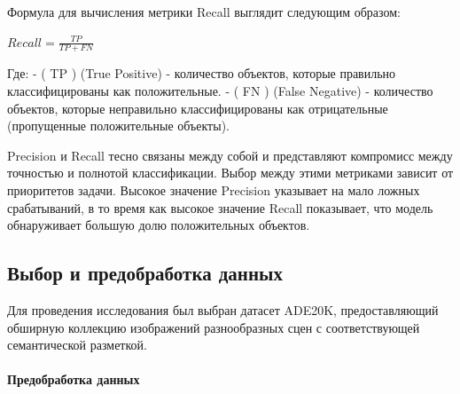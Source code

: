 \documentclass[11pt]{article}
\begin{document}
Формула для вычисления метрики Recall выглядит следующим образом:

\(Recall = \frac{TP}{TP + FN}\)

Где: - ( TP ) (True Positive) - количество объектов, которые правильно
классифицированы как положительные. - ( FN ) (False Negative) -
количество объектов, которые неправильно классифицированы как
отрицательные (пропущенные положительные объекты).

Precision и Recall тесно связаны между собой и представляют компромисс
между точностью и полнотой классификации. Выбор между этими метриками
зависит от приоритетов задачи. Высокое значение Precision указывает на
мало ложных срабатываний, в то время как высокое значение Recall
показывает, что модель обнаруживает большую долю положительных объектов.

    \hypertarget{ux432ux44bux431ux43eux440-ux438-ux43fux440ux435ux434ux43eux431ux440ux430ux431ux43eux442ux43aux430-ux434ux430ux43dux43dux44bux445}{%
\subsection{Выбор и предобработка
данных}\label{ux432ux44bux431ux43eux440-ux438-ux43fux440ux435ux434ux43eux431ux440ux430ux431ux43eux442ux43aux430-ux434ux430ux43dux43dux44bux445}}

Для проведения исследования был выбран датасет ADE20K, предоставляющий
обширную коллекцию изображений разнообразных сцен с соответствующей
семантической разметкой.

\hypertarget{ux43fux440ux435ux434ux43eux431ux440ux430ux431ux43eux442ux43aux430-ux434ux430ux43dux43dux44bux445}{%
\paragraph{Предобработка
данных}\label{ux43fux440ux435ux434ux43eux431ux440ux430ux431ux43eux442ux43aux430-ux434ux430ux43dux43dux44bux445}}
\end{document}
